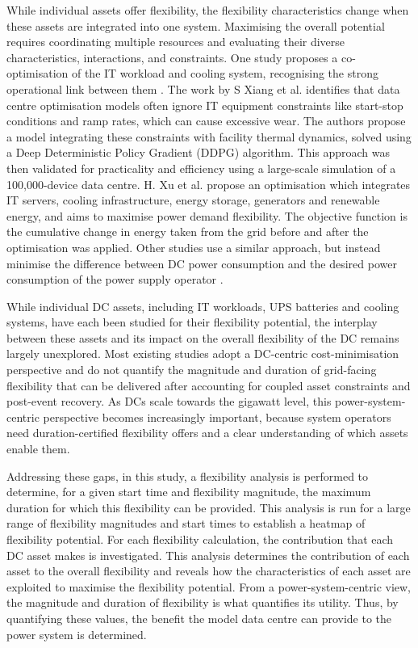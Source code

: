 \documentclass[lettersize,journal]{IEEEtran}
\newcommand{\rev}[1]{\textcolor{blue!70!black}{#1}}
\begin{document}
While individual assets offer flexibility, the flexibility characteristics change when these assets are integrated into one system. Maximising the overall potential requires coordinating multiple resources and evaluating their diverse characteristics, interactions, and constraints. One study proposes a co-optimisation of the IT workload and cooling system, recognising the strong operational link between them \cite{fu2020assessments}. The work by S Xiang et al. \cite{xiang2023modeling} identifies that data centre optimisation models often ignore IT equipment constraints like start-stop conditions and ramp rates, which can cause excessive wear. The authors propose a model integrating these constraints with facility thermal dynamics, solved using a Deep Deterministic Policy Gradient (DDPG) algorithm. This approach was then validated for practicality and efficiency using a large-scale simulation of a 100,000-device data centre.
H. Xu et al. \cite{xu2023data} propose an optimisation which integrates IT servers, cooling infrastructure, energy storage, generators and renewable energy, and aims to maximise power demand flexibility. The objective function is the cumulative change in energy taken from the grid before and after the optimisation was applied. 
Other studies use a similar approach, but instead minimise the difference between DC power consumption and the desired power consumption of the power supply operator \cite{cioara2018optimized}. 

\rev{While individual DC assets, including IT workloads, UPS batteries and cooling systems, have each been studied for their flexibility potential, the interplay between these assets and its impact on the overall flexibility of the DC remains largely unexplored. Most existing studies adopt a DC-centric cost-minimisation perspective and do not quantify the magnitude and duration of grid-facing flexibility that can be delivered after accounting for coupled asset constraints and post-event recovery. As DCs scale towards the gigawatt level, this power-system-centric perspective becomes increasingly important, because system operators need duration-certified flexibility offers and a clear understanding of which assets enable them.}

Addressing these gaps, in this study, a flexibility analysis is performed to determine, for a given start time and flexibility magnitude, the maximum duration for which this flexibility can be provided. This analysis is run for a large range of flexibility magnitudes and start times to establish a heatmap of flexibility potential. For each flexibility calculation, the contribution that each DC asset makes is investigated. This analysis determines the contribution of each asset to the overall flexibility and reveals how the characteristics of each asset are exploited to maximise the flexibility potential. From a power-system-centric view, the magnitude and duration of flexibility is what quantifies its utility. Thus, by quantifying these values, the benefit the model data centre can provide to the power system is determined. 
\end{document}
